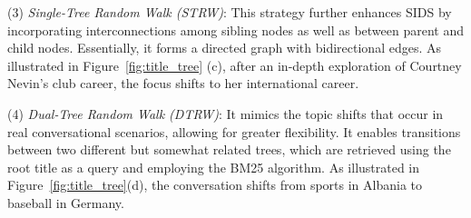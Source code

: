 \documentclass[11pt]{article}
\begin{document}
(3) \textit{Single-Tree Random Walk (STRW)}: This strategy further enhances SIDS by incorporating interconnections among sibling nodes as well as between parent and child nodes. Essentially, it forms a directed graph with bidirectional edges. As illustrated in Figure~\ref{fig:title_tree}
(c), after an in-depth exploration of Courtney Nevin's club career, the focus shifts to her international career.

(4) \textit{Dual-Tree Random Walk (DTRW)}: It mimics the topic shifts that occur in real conversational scenarios, allowing for greater flexibility. It enables transitions between two different but somewhat related trees, which are retrieved using the root title as a query and employing the BM25 algorithm. As illustrated in Figure~\ref{fig:title_tree}(d), the conversation shifts from sports in Albania to baseball in Germany.







\end{document}
